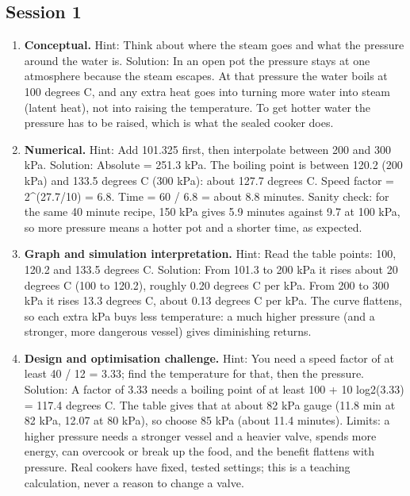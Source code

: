 \documentclass[11pt,a4paper]{article}
\begin{document}
\subsection*{Session 1}
\begin{enumerate}[nosep]
\item \textbf{Conceptual.} Hint: Think about where the steam goes and what the pressure around the water is. Solution: In an open pot the pressure stays at one atmosphere because the steam escapes. At that pressure the water boils at 100 degrees C, and any extra heat goes into turning more water into steam (latent heat), not into raising the temperature. To get hotter water the pressure has to be raised, which is what the sealed cooker does.
\item \textbf{Numerical.} Hint: Add 101.325 first, then interpolate between 200 and 300 kPa. Solution: Absolute = 251.3 kPa. The boiling point is between 120.2 (200 kPa) and 133.5 degrees C (300 kPa): about 127.7 degrees C. Speed factor = 2\textasciicircum{}(27.7/10) = 6.8. Time = 60 / 6.8 = about 8.8 minutes. Sanity check: for the same 40 minute recipe, 150 kPa gives 5.9 minutes against 9.7 at 100 kPa, so more pressure means a hotter pot and a shorter time, as expected.
\item \textbf{Graph and simulation interpretation.} Hint: Read the table points: 100, 120.2 and 133.5 degrees C. Solution: From 101.3 to 200 kPa it rises about 20 degrees C (100 to 120.2), roughly 0.20 degrees C per kPa. From 200 to 300 kPa it rises 13.3 degrees C, about 0.13 degrees C per kPa. The curve flattens, so each extra kPa buys less temperature: a much higher pressure (and a stronger, more dangerous vessel) gives diminishing returns.
\item \textbf{Design and optimisation challenge.} Hint: You need a speed factor of at least 40 / 12 = 3.33; find the temperature for that, then the pressure. Solution: A factor of 3.33 needs a boiling point of at least 100 + 10 log2(3.33) = 117.4 degrees C. The table gives that at about 82 kPa gauge (11.8 min at 82 kPa, 12.07 at 80 kPa), so choose 85 kPa (about 11.4 minutes). Limits: a higher pressure needs a stronger vessel and a heavier valve, spends more energy, can overcook or break up the food, and the benefit flattens with pressure. Real cookers have fixed, tested settings; this is a teaching calculation, never a reason to change a valve.
\end{enumerate}
\end{document}
